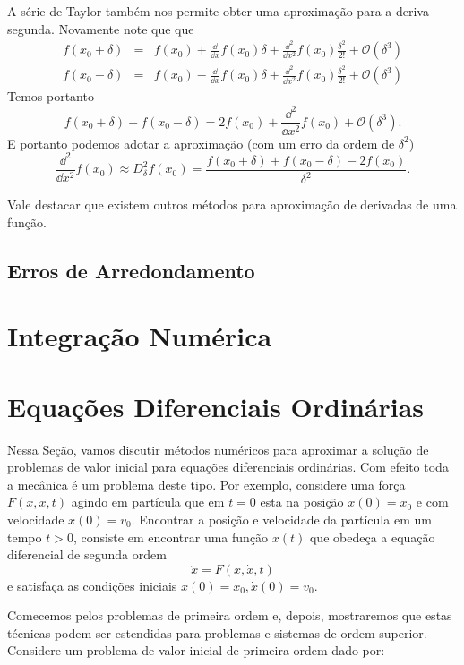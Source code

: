 A série de Taylor também nos permite obter uma aproximação para a deriva segunda. Novamente
note que que
\[\begin{array}{rcl}
f(x_0+\delta) & = & f(x_0) + \frac{\dd}{\dd x}f(x_0) \delta + \frac{\dd^2}{\dd x^2}f(x_0)  \frac{\delta^2}{2!}+ \mathcal{O}(\delta^3)\\
f(x_0-\delta) & = & f(x_0) - \frac{\dd}{\dd x}f(x_0) \delta + \frac{\dd^2}{\dd x^2}f(x_0)  \frac{\delta^2}{2!}+ \mathcal{O}(\delta^3)
\end{array}\]
Temos portanto
\[f(x_0+\delta) + f(x_0-\delta) = 2 f(x_0) + \frac{\dd^2}{\dd x^2}f(x_0) +  \mathcal{O}(\delta^3).\]
E portanto podemos adotar a aproximação (com um erro da ordem de $\delta^2$)
\[\frac{\dd^2}{\dd x^2}f(x_0) \approx D_\delta^2 f(x_0) = \frac{f(x_0+\delta) + f(x_0-\delta) - 2 f(x_0)}{\delta^2}.\]

Vale destacar que existem outros métodos para aproximação de derivadas de uma função.

\subsection{Erros de Arredondamento}





\section{Integração Numérica}

\section{Equações Diferenciais Ordinárias}

Nessa Seção, vamos discutir métodos numéricos para aproximar a solução de problemas de valor inicial para equações diferenciais ordinárias. Com efeito toda a mecânica é um problema deste tipo. Por exemplo, considere uma força $F(x,\dot x, t)$ agindo em partícula que em $t=0$ esta na posição $x(0)=x_0$ e com velocidade $\dot x(0) = v_0$. Encontrar a posição e velocidade da partícula em um tempo $t>0$, consiste em encontrar uma função $x(t)$ que obedeça a equação diferencial de segunda ordem
\[ \ddot x = F(x,\dot x, t)\]
e satisfaça as condições iniciais $x(0)=x_0, \dot x(0) = v_0$.

Comecemos pelos problemas de primeira ordem e, depois, mostraremos que estas técnicas podem ser estendidas para problemas e sistemas de ordem superior. Considere um problema de valor inicial de primeira ordem dado por:

